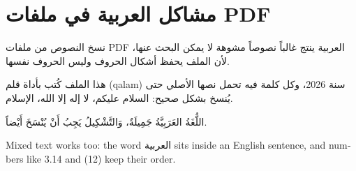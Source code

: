 \documentclass{article}
\begin{document}
\section*{مشاكل العربية في ملفات PDF}

نسخ النصوص من ملفات PDF العربية ينتج غالباً نصوصاً مشوهة لا يمكن البحث عنها، لأن الملف يحفظ أشكال الحروف وليس الحروف نفسها.

هذا الملف كُتب بأداة قلم (qalam) سنة 2026، وكل كلمة فيه تحمل نصها الأصلي حتى يُنسخ بشكل صحيح: السلام عليكم، لا إله إلا الله، الإسلام.

اللُّغَةُ العَرَبِيَّةُ جَمِيلَةٌ، وَالتَّشْكِيلُ يَجِبُ أَنْ يُنْسَخَ أَيْضاً.

\begin{otherlanguage}{english}Mixed text works too: the word العربية sits inside an English sentence, and numbers like 3.14 and (12) keep their order.\end{otherlanguage}
\end{document}
